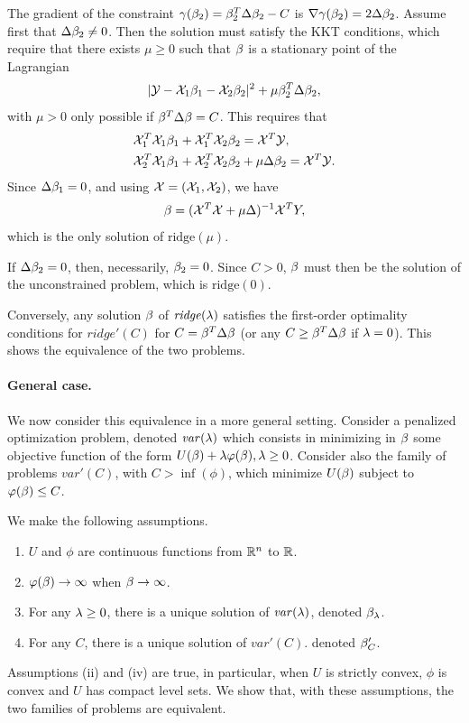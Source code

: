 The gradient of the constraint $\gamma(\beta_2) = \beta_2^T \Delta \beta_2 - C$ is $\nabla \gamma(\beta_2) = 2 \Delta\beta_2$. Assume first that $\Delta \beta_2 \neq 0$. Then the solution must satisfy the KKT conditions, which require that there exists  $\mu \geq 0$ such that $\beta$ is a stationary
point of the Lagrangian
$$
|{\mathcal Y} - {\mathcal X}_1 \beta_1 - {\mathcal X}_2\beta_2|^2 + \mu \beta_2^T\Delta\beta_2,
$$
with $\mu > 0$ only possible if $\beta^T\Delta\beta = C$. This requires that 
\[
\begin{aligned}
&{\mathcal X}_1^T{\mathcal X}_1 \beta_1 + {\mathcal X}_1^T{\mathcal X}_2 \beta_2  = {\mathcal X}^T{\mathcal Y},\\
&{\mathcal X}_2^T{\mathcal X}_1 \beta_1 + {\mathcal X}_2^T{\mathcal X}_2 \beta_2  + \mu \Delta \beta_2 = {\mathcal X}^T{\mathcal Y}.
\end{aligned}
\]
Since $\Delta\beta_1 = 0$, and using ${\mathcal X} = ({\mathcal X}_1, {\mathcal X}_2)$, we have
\[
\beta  = ({\mathcal X}^T{\mathcal X} +\mu \Delta)^{-1} {\mathcal X}^T Y,
\]
which is the only solution of  $\text{ridge}(\mu)$.

If $\Delta\beta_2 = 0$, then, necessarily, $\beta_2 = 0$. Since $C>0$, $\beta$ must then be the solution of the unconstrained problem, which is  $\text{ridge}(0)$.

Conversely, any solution $\beta$ of
$\mathit{ridge}(\lambda)$ satisfies the first-order optimality conditions for $\mathit{ridge}'(C)$ for $C =
\beta^T \Delta \beta$ (or any $C \geq
\beta^T \Delta \beta$ if $\lambda=0$). This shows the equivalence of the two problems.


\paragraph{General case.}
We now consider this equivalence in a more general setting. Consider a
 penalized optimization problem, denoted $\mathit{var}(\lambda)$
which consists in minimizing in $\beta$ some objective function of the form $U(\beta)
+ \lambda \varphi(\beta), \lambda \geq 0$. Consider also the family of problems $\mathit{var}'(C)$, with $C>\inf(\phi)$, which minimize
$U(\beta)$ subject to $\varphi(\beta) \leq C$.

We make the following assumptions.
\begin{enumerate}[label=(\roman*)]
\item  $U$ and $\phi$ are continuous functions from ${\mathbb{R}}^n$ to ${\mathbb{R}}$.
\item $\varphi(\beta) \to \infty$ when $\beta\to\infty$. 
\item For any $\lambda\geq 0$, there is a unique solution
of $\mathit{var}(\lambda)$,  denoted  $\beta_\lambda$. 
\item For any $C$, there is a unique solution
of $\mathit{var}'(C)$.  denoted  $\beta'_C$. 
\end{enumerate}
Assumptions (ii) and (iv) are true, in particular, when $U$ is strictly convex, $\phi$ is convex and $U$ has compact level sets.
We show that, with these assumptions,  the
two families of problems are equivalent.

